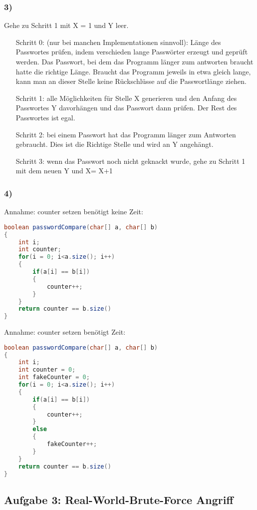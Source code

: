\documentclass{article}
\begin{document}
\subsubsection*{3)}
Gehe zu Schritt 1 mit X = 1 und Y leer.
\begin{enumerate}
    \item[Schritt 0:] (nur bei manchen Implementationen sinnvoll): Länge des Passwortes prüfen, indem verschieden lange Passwörter erzeugt und geprüft werden.
Das Passwort, bei dem das Programm länger zum antworten braucht hatte die richtige Länge. Braucht das Programm jeweils in etwa gleich lange, kann man an dieser Stelle keine Rückschlüsse auf die Passwortlänge ziehen.
    \item[Schritt 1:] alle Möglichkeiten für Stelle X generieren und den Anfang des Passwortes Y davorhängen und das Passwort dann prüfen. Der Rest des Passwortes ist egal.
    \item[Schritt 2:] bei einem Passwort hat das Programm länger zum Antworten gebraucht. Dies ist die Richtige Stelle und wird an Y angehängt.
    \item[Schritt 3:] wenn das Passwort noch nicht geknackt wurde, gehe zu Schritt 1 mit dem neuen Y und X= X+1
\end{enumerate}
\subsubsection*{4)}
Annahme: counter setzen benötigt keine Zeit:
\begin{lstlisting}[language=Java]
boolean passwordCompare(char[] a, char[] b)
{
	int i;
	int counter;
	for(i = 0; i<a.size(); i++)
	{
		if(a[i] == b[i])
		{
			counter++;
		}
	}
	return counter == b.size()
}
\end{lstlisting}
Annahme: counter setzen benötigt Zeit:
\begin{lstlisting}[language=Java]
boolean passwordCompare(char[] a, char[] b)
{
	int i;
	int counter = 0;
	int fakeCounter = 0;
	for(i = 0; i<a.size(); i++)
	{
		if(a[i] == b[i])
		{
			counter++;
		}
		else
		{
			fakeCounter++;
		}
	}
	return counter == b.size()
}
\end{lstlisting}
\subsection*{Aufgabe 3: Real-World-Brute-Force Angriff}
\end{document}
